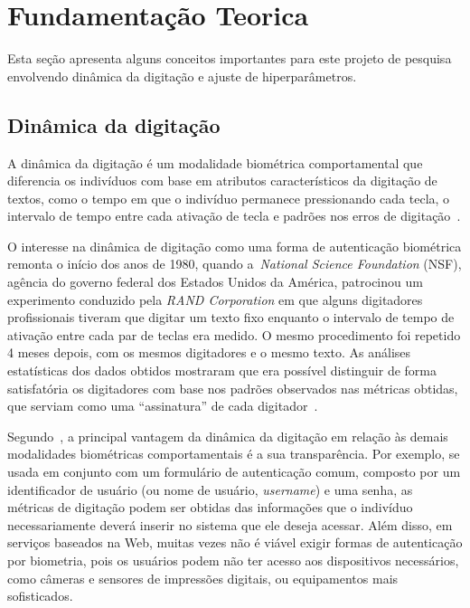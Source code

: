 \section{Fundamentação Teorica}\label{sec:fundamentacao_teorica}

Esta seção apresenta alguns conceitos importantes para este projeto de pesquisa envolvendo dinâmica da digitação e ajuste de hiperparâmetros.

\subsection{Dinâmica da digitação}\label{subsec:dinamica_de_digitacao}

A dinâmica da digitação é um modalidade biométrica comportamental que diferencia os indivíduos com base em atributos característicos da digitação de textos, como o tempo em que o indivíduo permanece pressionando cada tecla, o intervalo de tempo entre cada ativação de tecla e padrões nos erros de digitação~\cite{biometric_personal_auth_using_keystroke_dynamics}.

O interesse na dinâmica de digitação como uma forma de autenticação biométrica remonta o início dos anos de 1980, quando a~\textit{National Science Foundation} (NSF), agência do governo federal dos Estados Unidos da América, patrocinou um experimento conduzido pela \textit{RAND Corporation} em que alguns digitadores profissionais tiveram que digitar um texto fixo enquanto o intervalo de tempo de ativação entre cada par de teclas era medido. O mesmo procedimento foi repetido 4 meses depois, com os mesmos digitadores e o mesmo texto. As análises estatísticas dos dados obtidos mostraram que era possível distinguir de forma satisfatória os digitadores com base nos padrões observados nas métricas obtidas, que serviam como uma ``assinatura'' de cada digitador~\cite{authentication_by_keystroke_timing}.

Segundo~, a principal vantagem da dinâmica da digitação em relação às demais modalidades biométricas comportamentais é a sua transparência. Por exemplo, se usada em conjunto com um formulário de autenticação comum, composto por um identificador de usuário (ou nome de usuário, \textit{username}) e uma senha, as métricas de digitação podem ser obtidas das informações que o indivíduo necessariamente deverá inserir no sistema que ele deseja acessar. Além disso, em serviços baseados na Web, muitas vezes não é viável exigir formas de autenticação por biometria, pois os usuários podem não ter acesso aos dispositivos necessários, como câmeras e sensores de impressões digitais, ou equipamentos mais sofisticados.

